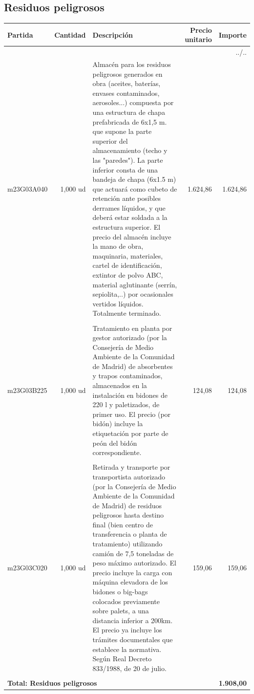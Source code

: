 \documentclass{book}%
\begin{document}
\subsection{Residuos peligrosos}%
\small%
\begin{longtable}{lrlrr}%
Partida&Cantidad&Descripción&\multicolumn{1}{p{1.5cm}}{Precio unitario}&Importe\\%
\hline%
\endhead%
\multicolumn{5}{r}{../..}\\%
\endfoot%
\hline%
\endlastfoot%
m23G03A040&     1,000 ud&\multicolumn{1}{p{5cm}}{Almacén para los residuos peligrosos generados en obra (aceites, baterías, envases contaminados, aerosoles...) compuesta por una estructura de chapa prefabricada de 6x1,5 m. que supone la parte superior del almacenamiento (techo y las "paredes"). La parte inferior consta de una bandeja de chapa (6x1.5 m) que actuará como cubeto de retención ante posibles derrames líquidos, y que deberá estar soldada a la estructura superior. El precio del almacén incluye la mano de obra, maquinaria, materiales, cartel de identificación, extintor de polvo ABC, material aglutinante (serrín, sepiolita,..) por ocasionales vertidos líquidos. Totalmente terminado.}&  1.624,86&1.624,86\\%
&&&&\\%
m23G03B225&     1,000 ud&\multicolumn{1}{p{5cm}}{Tratamiento en planta por gestor autorizado (por la Consejería de Medio Ambiente de la Comunidad de Madrid) de absorbentes y trapos contaminados, almacenados en la instalación en bidones de 220 l y paletizados, de primer uso. El precio (por bidón) incluye la etiquetación por parte de peón del bidón correspondiente.}&    124,08&124,08\\%
&&&&\\%
m23G03C020&     1,000 ud&\multicolumn{1}{p{5cm}}{Retirada y transporte por transportista autorizado (por la Consejería de Medio Ambiente de la Comunidad de Madrid) de residuos peligrosos hasta destino final (bien centro de transferencia o planta de tratamiento) utilizando camión de 7,5 toneladas de peso máximo autorizado. El precio incluye la carga con máquina elevadora de los bidones o big{-}bags colocados previamente sobre palets, a una distancia inferior a 200km. El precio ya incluye los trámites documentales que establece la normativa. Según Real Decreto 833/1988, de 20 de julio.}&    159,06&159,06\\%
&&&&\\%
\multicolumn{4}{p{8cm}}{\textbf{Total: Residuos peligrosos}}&\textbf{1.908,00}\\%
\end{longtable}%
\normalsize
\end{document}
